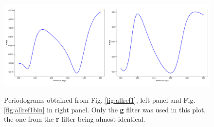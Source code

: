 \begin{figure}[!htbp]
\begin{center}
\includegraphics[scale=0.25]{images/ls1both.png}
\end{center}   
\caption{Periodograms obtained from Fig. \ref{fig:allref1}, left panel and Fig. \ref{fig:allref1bin} in right
  panel. Only the \textbf{g} filter was used in this plot, the one from the \textbf{r} filter being almost identical.}
\protect\label{fig:ls1both}
\end{figure}
\clearpage
